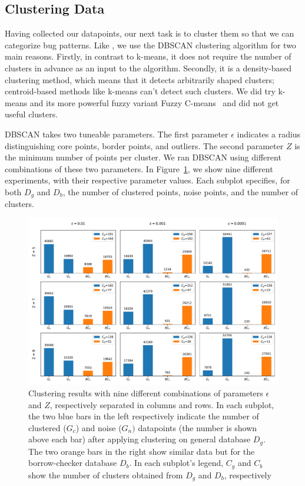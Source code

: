\subsection{\label{sec:clustering_data}Clustering Data}
\label{sec:clustering}

Having collected our datapoints, our next task is to cluster them so that we can categorize bug patterns. Like \cite{hanam2016discovering}, we use the DBSCAN clustering algorithm for two main reasons. Firstly, in contrast to k-means, it does not require the number of clusters in advance as an input to the algorithm. Secondly, it is a density-based clustering method, which means that it detects arbitrarily shaped clusters; centroid-based methods like k-means can't detect such clusters. We did try k-means and its more powerful fuzzy variant Fuzzy C-means~\citep{dunn1973fuzzy} and did not get useful clusters.

DBSCAN takes two tuneable parameters. The first parameter $\epsilon$ indicates a radius distinguishing core points, border points, and outliers. The second parameter $Z$ is the minimum number of points per cluster. We ran DBSCAN using different combinations of these two parameters. In Figure~\ref{fig:clustering}, we show nine different experiments, with their respective parameter values. Each subplot specifies, for both $D_g$ and $D_b$, the number of clustered points, noise points, and the number of clusters.

\begin{figure}[h]
\centering
\includegraphics[width=1\textwidth]{clusters.pdf}
\caption{\label{fig:clustering} Clustering results with nine different combinations of parameters $\epsilon$ and $Z$, respectively separated in columns and rows. In each subplot, the two blue bars in the left respectively indicate the number of clustered ($G_c$) and noise ($G_n)$ datapoints (the number is shown above each bar) after applying clustering on general database $D_g$. The two orange bars in the right show similar data but for the borrow-checker database $D_{b}$. In each subplot's legend, $C_g$ and $C_b$ show the number of clusters obtained from $D_g$ and $D_b$, respectively}
\end{figure}

